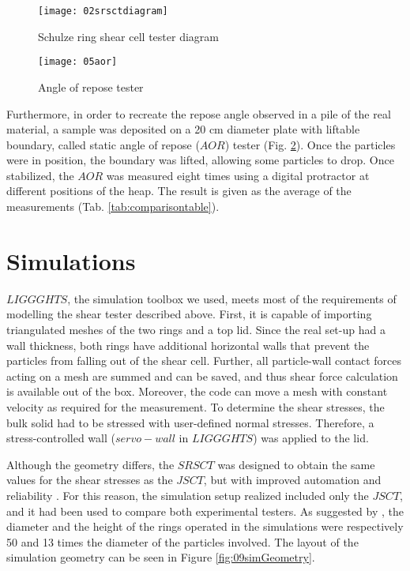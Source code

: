 \documentclass{CFD2015}
\begin{document}
\begin{figure}[!htb] 
\centering 
\texttt{[image: 02srsctdiagram]} 
\caption[Srsct diagram]{Schulze ring shear cell tester diagram \cite{RefWorks:118}}
\label{fig:02srsctdiagram} 
\end{figure}

\begin{figure}[!htb] 
\centering 
\texttt{[image: 05aor]} 
\caption[Aort]{Angle of repose tester \cite{RefWorks:118}}
\label{fig:05aor} 
\end{figure}

Furthermore, in order to recreate the repose angle observed in a pile of the real material, a sample was deposited on a 20 cm diameter plate with liftable boundary, called static angle of repose ($AOR$) tester (Fig. \ref{fig:05aor}). 
Once the particles were in position, the boundary was lifted, allowing some particles to drop. Once stabilized, the $AOR$ was measured eight times using a digital protractor at different positions of the heap. The result is given as the average of the measurements (Tab. \ref{tab:comparisontable}).\\



\section{Simulations}

$LIGGGHTS$, the simulation toolbox we used, meets most of the requirements of modelling the shear tester described above. First, it is capable of importing triangulated meshes of the two rings and a top lid. Since the real set-up had a wall thickness, both rings have additional horizontal walls that prevent the particles from falling out of the shear cell. Further, all particle-wall contact forces acting on a mesh are summed and can be saved, and thus shear force calculation is available out of the box. Moreover, the code can move a mesh with constant velocity as required for the measurement. 
To determine the shear stresses, the bulk solid had to be stressed with user-defined normal stresses.
Therefore, a stress-controlled wall ($servo-wall$ in $LIGGGHTS$) was applied to the lid. \\

Although the geometry differs, the $SRSCT$ was designed to obtain the same values for the shear stresses as the $JSCT$, but with improved automation and reliability \cite{RefWorks:118}. 
For this reason, the simulation setup realized included only the $JSCT$, and it had been used to compare both experimental testers.
As suggested by \citet{RefWorks:139}, the diameter and the height of the rings operated in the simulations were respectively 50 and 13 times the diameter of the particles involved.
The layout of the simulation geometry can be seen in Figure \ref{fig:09simGeometry}. \\
\end{document}
